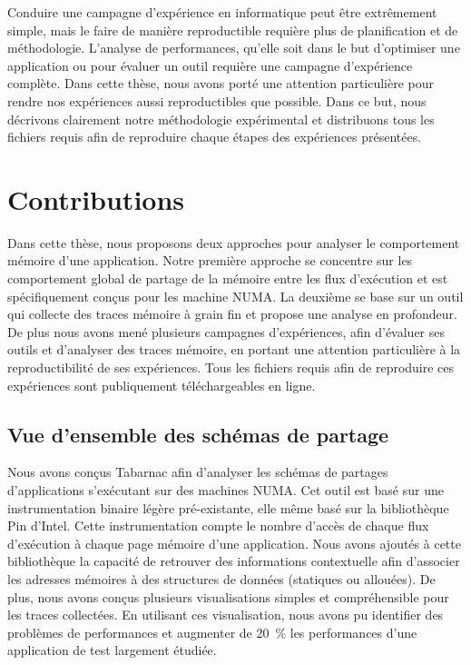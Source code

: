 Conduire une campagne d'expérience en informatique peut être extrêmement simple, mais le faire de manière reproductible requière plus de planification et de méthodologie.
L'analyse de performances, qu'elle soit dans le but d'optimiser une application ou pour évaluer un outil requière une campagne d'expérience complète.
Dans cette thèse, nous avons porté une attention particulière pour rendre nos expériences aussi reproductibles que possible.
Dans ce but, nous décrivons clairement notre méthodologie expérimental et distribuons tous les fichiers requis afin de reproduire chaque étapes des expériences présentées.

\section{Contributions}

Dans cette thèse, nous proposons deux approches pour analyser le comportement mémoire d'une application.
Notre première approche se concentre sur les comportement global de partage de la mémoire entre les flux d'exécution et est spécifiquement conçus pour les machine NUMA.
La deuxième se base sur un outil qui collecte des traces mémoire à grain fin et propose une analyse en profondeur.
De plus nous avons mené plusieurs campagnes d'expériences, afin d'évaluer ses outils et d'analyser des traces mémoire, en portant une attention particulière à la reproductibilité de ses expériences.
Tous les fichiers requis afin de reproduire ces expériences sont publiquement téléchargeables en ligne.

\subsection{Vue d'ensemble des schémas de partage}

Nous avons conçus \gls{Tabarnac} afin d'analyser les schémas de partages d'applications s'exécutant sur des machines NUMA.
Cet outil est basé sur une instrumentation binaire légère pré-existante, elle même basé sur la bibliothèque \gls{Pin} d'\gls{Intel}.
Cette instrumentation compte le nombre d'accès de chaque flux d'exécution à chaque page mémoire d'une application.
Nous avons ajoutés à cette bibliothèque la capacité de retrouver des informations contextuelle afin d'associer les adresses mémoires à des structures de données (statiques ou allouées).
De plus, nous avons conçus plusieurs visualisations simples et compréhensible pour les traces collectées.
En utilisant ces visualisation, nous avons pu identifier des problèmes de performances et augmenter de \SI{20}{\%} les performances d'une application de test largement étudiée.

